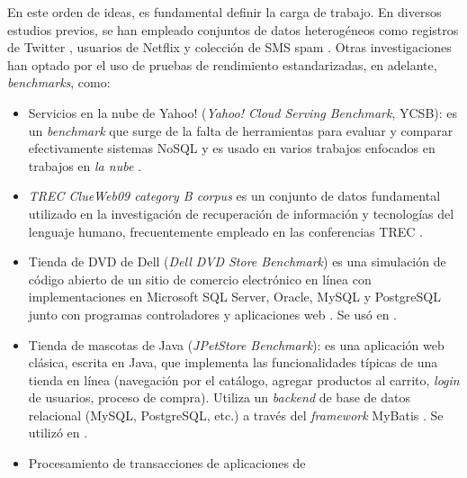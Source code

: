 \documentclass[12pt, letter paper]{report}
\begin{document}
        En este orden de ideas, es fundamental definir la carga de trabajo. En
        diversos estudios previos, se han empleado conjuntos de datos
        heterogéneos como registros de Twitter \cite{mahajanimproving2019},
        usuarios de Netflix y colección de SMS spam \cite{lelladbjoules2023}.
        Otras investigaciones han optado por el uso de pruebas de rendimiento
        estandarizadas, en adelante, \textit{benchmarks}, como:
          \begin{itemize}
            \item Servicios en la nube de Yahoo! (\textit{Yahoo! Cloud Serving
            Benchmark}, YCSB): es un \textit{benchmark} que surge de la  falta
            de herramientas para evaluar y comparar efectivamente sistemas NoSQL
            \cite{cooperbenchmarking2010} y es usado en varios trabajos
            enfocados en trabajos en \textit{la nube} \cite{mahajanenergy2017,
            mahajanimproving2019, gomesenergy2016, subramaniamenergy2015,
            garcia-recueroenergy2016, casalicchioenergy-aware2017}.
            \item \textit{TREC ClueWeb09 category B corpus}
            \cite{macdonaldefficient2017} es un conjunto de datos fundamental
            utilizado en la investigación de recuperación de información y
            tecnologías del lenguaje humano, frecuentemente empleado en las
            conferencias TREC \cite{clueweb09}.
            \item Tienda de DVD de Dell (\textit{Dell DVD Store Benchmark}) es
            una simulación de código abierto de un sitio de comercio
            electrónico en línea con implementaciones en Microsoft SQL Server,
            Oracle, MySQL y PostgreSQL junto con programas controladores y
            aplicaciones web \cite{delltechnologiesindex2010}. Se usó en
            \cite{banistudy2016}.
            \item Tienda de mascotas de Java (\textit{JPetStore Benchmark}): es
            una aplicación web clásica, escrita en Java, que implementa las
            funcionalidades típicas de una tienda en línea (navegación por el
            catálogo, agregar productos al carrito, \textit{login} de usuarios,
            proceso de compra). Utiliza un \textit{backend} de base de datos
            relacional (MySQL, PostgreSQL, etc.) a través del \textit{framework}
            MyBatis \cite{jungjpetstore2018, mybatismybatisjpetstore-62025}. Se
            utilizó en \cite{banistudy2016}.
            \item Procesamiento de transacciones de aplicaciones de

\end{itemize}
\end{document}
